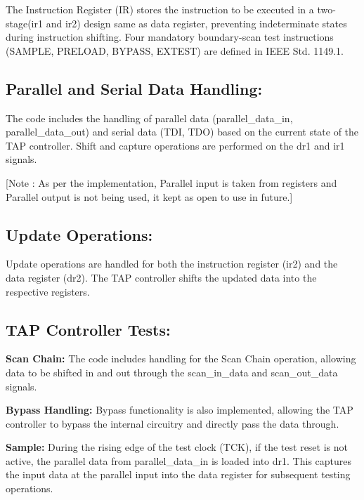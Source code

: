 The Instruction Register (IR) stores the instruction to be executed in a two-stage(ir1 and ir2) design same as data register, preventing indeterminate states during instruction shifting. Four mandatory boundary-scan test instructions (SAMPLE, PRELOAD, BYPASS, EXTEST) are defined in IEEE Std. 1149.1.
\vspace{3mm}

\subsection{\textbf{Parallel and Serial Data Handling:}}
The code includes the handling of parallel data (parallel\_data\_in, parallel\_data\_out) and serial data (TDI, TDO) based on the current state of the TAP controller.
Shift and capture operations are performed on the dr1 and ir1 signals.
\vspace{2mm}

[Note : As per the implementation, Parallel input is taken from registers and Parallel output is not being used, it kept as open to use in future.]
\vspace{3mm}

\subsection{\textbf{Update Operations:}}
Update operations are handled for both the instruction register (ir2) and the data register (dr2).
The TAP controller shifts the updated data into the respective registers.
\vspace{3mm}
\newpage
\subsection{\textbf{TAP Controller Tests:}}
\textbf{Scan Chain:}
The code includes handling for the Scan Chain operation, allowing data to be shifted in and out through the scan\_in\_data and scan\_out\_data signals.
\vspace{1mm}

\textbf{Bypass Handling:}
Bypass functionality is also implemented, allowing the TAP controller to bypass the internal circuitry and directly pass the data through.
\vspace{1mm}

\textbf{Sample:}
During the rising edge of the test clock (TCK), if the test reset is not active, the parallel data from parallel\_data\_in is loaded into dr1.
This captures the input data at the parallel input into the data register for subsequent testing operations.
\vspace{1mm}

